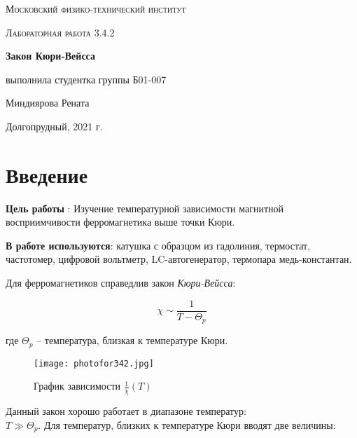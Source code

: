 \documentclass[a4paper,13pt]{article}
\begin{document}
\begin{titlepage}
	\centering
	\vspace{5cm}
	{\scshape\LARGE Московский физико-технический институт \par}
	\vspace{4cm}
	{\scshape\Large Лабораторная работа 3.4.2 \par}
	\vspace{1cm}
	{\huge\bfseries Закон Кюри-Вейсса \par}
	\vspace{1cm}
	\vfill
\begin{flushright}
	{\large выполнила студентка группы Б01-007}\par
	\vspace{0.3cm}
	{\LARGE Миндиярова Рената}
\end{flushright}
	

	\vfill

	Долгопрудный, 2021 г.
\end{titlepage}


\section{Введение}
\textbf{Цель работы} : Изучение температурной зависимости магнитной восприимчивости ферромагнетика выше точки Кюри.


\textbf{В работе используются}: катушка с образцом из гадолиния, термостат, частотомер, цифровой вольтметр, LC-автогенератор, термопара медь-константан.


Для ферромагнетиков справедлив закон \textit{Кюри-Вейсса}:
	
	\begin{equation}
		\chi \sim \frac{1}{T - \Theta_{p}}
	\end{equation}
	
	где $\Theta_{p}$ -- температура, близкая к температуре Кюри.\\
	
	\begin{wrapfigure}[10]{r}{0.23\textwidth}
		\vspace{-1.5cm}
		\centering
		\texttt{[image: photofor342.jpg]}
		\caption{График зависимости $\frac{1}{\chi}\left(T\right)$}
		\label{fig:photofor342}
	\end{wrapfigure}
	
	Данный закон хорошо работает в диапазоне температур:\\ $T \gg \Theta_{p}$. Для температур, близких к температуре Кюри вводят две величины:
	
\end{document}
